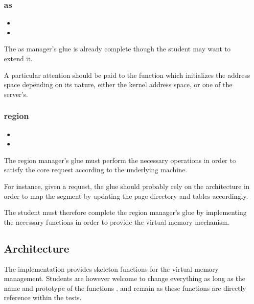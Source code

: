 \subsubsection*{as}

\begin{itemize}
  \item
  \item
\end{itemize}

The as manager's glue is already complete though the student may want to extend
it.

A particular attention should be paid to the 
function which initializes the address space depending on its nature,
either the kernel address space, or one of the server's.

\subsubsection*{region}

\begin{itemize}
  \item
  \item
\end{itemize}

The region manager's glue must perform the necessary operations in order to
satisfy the core request according to the underlying machine.

For instance, given a  request, the glue should
probably rely on the architecture in order to map the segment by updating
the page directory and tables accordingly.

The student must therefore complete the region manager's glue by implementing
the necessary functions in order to provide the virtual memory mechanism.

\subsection{Architecture}

The  implementation provides skeleton functions for
the virtual memory management. Students are however welcome to change
everything as long as the name and prototype of the functions
,  and
 remain as these functions are directly
reference within the tests.

